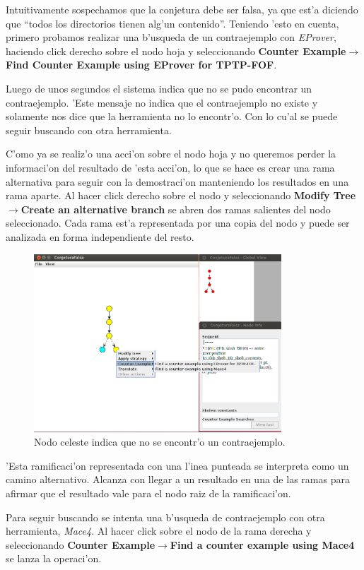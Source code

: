 Intuitivamente sospechamos que la conjetura debe ser falsa, ya que est'a diciendo que ``todos los directorios tienen alg'un contenido''. Teniendo 'esto en cuenta, primero probamos realizar una b'usqueda de un contraejemplo con \textit{EProver}, haciendo click derecho sobre el nodo hoja y seleccionando \textbf{Counter Example$\rightarrow$Find Counter Example using EProver for TPTP-FOF}.

Luego de unos segundos el sistema indica que no se pudo encontrar un contraejemplo. 'Este mensaje no indica que el contraejemplo no existe y solamente nos dice que la herramienta no lo encontr'o. Con lo cu'al se puede seguir buscando con otra herramienta.

C'omo ya se realiz'o una acci'on sobre el nodo hoja y no queremos perder la informaci'on del resultado de 'esta acci'on, lo que se hace es crear una rama alternativa para seguir con la demostraci'on manteniendo los resultados en una rama aparte. Al hacer click derecho sobre el nodo y seleccionando \textbf{Modify Tree$\rightarrow$Create an alternative branch} se abren dos ramas salientes del nodo seleccionado. Cada rama est'a representada por una copia del nodo y puede ser analizada en forma independiente del resto.

\begin{figure}[H]
	\includegraphics[width=350px]{img/conjetura_falsa_3.png}
	\centering
	\caption{Nodo celeste indica que no se encontr'o un contraejemplo.}
\end{figure}

'Esta ramificaci'on representada con una l'inea punteada se interpreta como un camino alternativo. Alcanza con llegar a un resultado en una de las ramas para afirmar que el resultado vale para el nodo raiz de la ramificaci'on.

Para seguir buscando se intenta una b'usqueda de contraejemplo con otra herramienta, \textit{Mace4}. Al hacer click sobre el nodo de la rama derecha y seleccionando \textbf{Counter Example$\rightarrow$Find a counter example using Mace4} se lanza la operaci'on.

